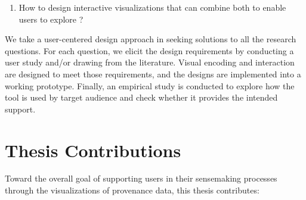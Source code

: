 \begin{enumerate}
	\item How to design interactive visualizations that can combine both  to enable users to explore ?
	
\end{enumerate}

We take a user-centered design approach in seeking solutions to all the research questions. For each question, we elicit the design requirements by conducting a user study and/or drawing from the literature. Visual encoding and interaction are designed to meet those requirements, and the designs are implemented into a working prototype. Finally, an empirical study is conducted to explore how the tool is used by target audience and check whether it provides the intended support. 

%

\section{Thesis Contributions}
Toward the overall goal of supporting users in their sensemaking processes through the visualizations of provenance data, this thesis contributes:

